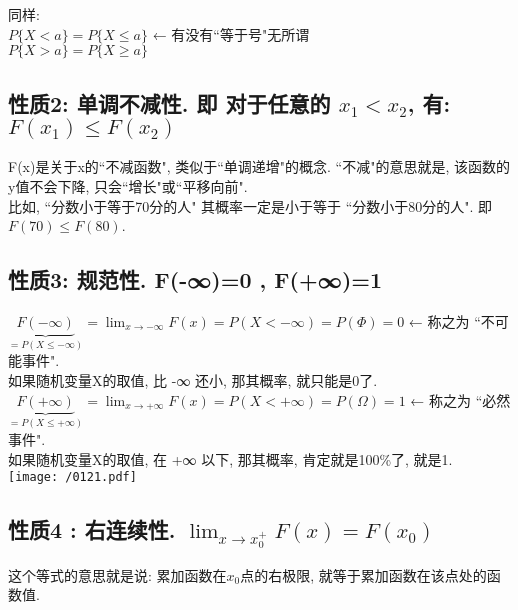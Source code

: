 \documentclass[UTF8]{ctexart}
\begin{document}
	同样: \\
	$P\{X<a\} = P \{X \leq a \}$  ← 有没有``等于号"无所谓 \\
	$P\{X > a\} = P \{X \geq a \} $
	
	
	
	
	
	\subsection{性质2: 单调不减性. 即 对于任意的 $x_1 < x_2$, 有: $F(x_1) \leq F(x_2)$}
	
	F(x)是关于x的``不减函数", 类似于``单调递增"的概念. ``不减"的意思就是, 该函数的y值不会下降, 只会``增长"或``平移向前". \\
	
	比如, ``分数小于等于70分的人" 其概率一定是小于等于 ``分数小于80分的人". 即 $F(70) \leq F(80)$.
	
	
	
	\subsection{性质3: 规范性. F(-∞)=0 , F(+∞)=1}
	
	$ \boxed{
		\underset{=P(X\leq -\infty )}{\underbrace{F(-\infty )}}=\lim_{x\rightarrow -\infty}F(x)=P(X < - \infty) = P(\Phi)=0
	}$ ← 称之为 ``不可能事件". \\
	如果随机变量X的取值, 比 -∞ 还小, 那其概率, 就只能是0了. \\
	
	
	$\boxed{
		\underset{=P(X\leq +\infty )}{\underbrace{F(+\infty )}}=\lim_{x\rightarrow +\infty}F(x)=P(X < + \infty) = P(\Omega)=1
	}$ ← 称之为 ``必然事件". \\
	如果随机变量X的取值, 在 +∞ 以下, 那其概率, 肯定就是100\%了, 就是1. \\
	
	\texttt{[image: /0121.pdf]} \\
	
	
	
	
	
	
	
	\subsection{性质4 : 右连续性. $\lim_{x \to x_0^+} F(x)=F(x_0)$ }
	
	这个等式的意思就是说: 累加函数在$x_0$点的右极限, 就等于累加函数在该点处的函数值. \\
	
\end{document}
